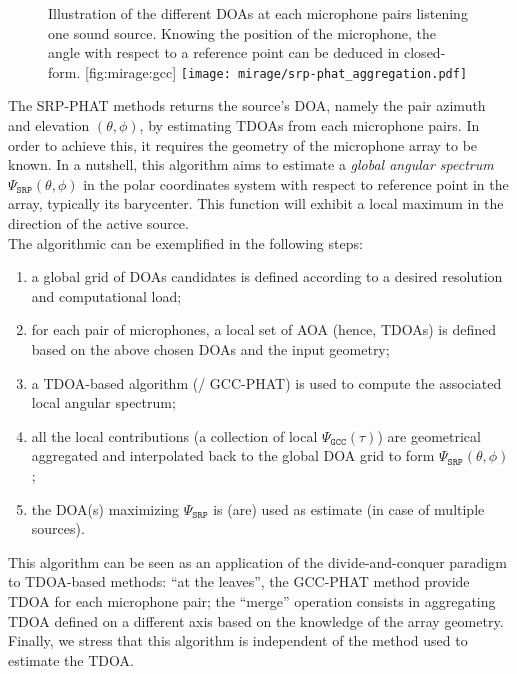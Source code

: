 \mynewline
\begin{figure}
    \begin{sidecaption}[t]{
        Illustration of the different \acp{DOA} at each microphone pairs listening one sound source.
        Knowing the position of the microphone, the angle with respect to a reference point can be deduced in closed-form.
    }[fig:mirage:gcc]
        \texttt{[image: mirage/srp-phat\_aggregation.pdf]}
    \end{sidecaption}
\end{figure}
The \ac{SRP-PHAT} methods returns the source's \ac{DOA}, namely the pair azimuth and elevation $(\theta, \phi)$, by estimating \acp{TDOA} from each microphone pairs.
In order to achieve this, it requires the geometry of the microphone array to be known.
In a nutshell, this algorithm aims to estimate a \textit{global angular spectrum} $\Psi_{\mathtt{SRP}}(\theta,\phi)$ in the polar coordinates system with respect to reference point in the array, typically its barycenter.
This function will exhibit a local maximum in the direction of the active source.
\\The algorithmic can be exemplified in the following steps:
\begin{enumerate}
    \item a global grid of \acp{DOA} candidates is defined according to a desired resolution and computational load;
    \item for each pair of microphones, a local set of \ac{AOA} (hence, \acp{TDOA}) is defined based on the above chosen \acp{DOA} and the input geometry;
    \item a TDOA-based algorithm (\eg/ \ac{GCC-PHAT}) is used to compute the associated local angular spectrum;
    \item all the local contributions (a collection of local $\Psi_\mathtt{GCC}(\tau)$) are geometrical aggregated and interpolated back to the global \ac{DOA} grid to form $\Psi_{\mathtt{SRP}}(\theta,\phi)$;
    \item the \acs{DOA}(s) maximizing $\Psi_\mathtt{SRP}$ is (are) used as estimate (in case of multiple sources).
\end{enumerate}
This algorithm can be seen as an application of the divide-and-conquer paradigm to \ac{TDOA}-based methods:
``at the leaves'', the \ac{GCC-PHAT} method provide \ac{TDOA} for each microphone pair;
the ``merge'' operation consists in aggregating \ac{TDOA} defined on a different axis based on the knowledge of the array geometry.
Finally, we stress that this algorithm is independent of the method used to estimate the \ac{TDOA}.

